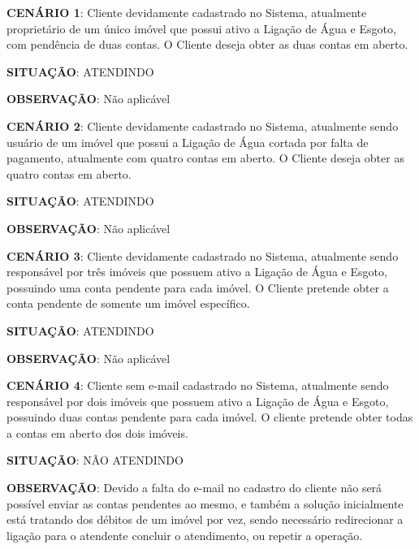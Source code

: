\begin{flushleft}
	\begin{description}
		\item \textbf{CENÁRIO 1}: Cliente devidamente cadastrado no Sistema, atualmente proprietário de um único imóvel que possui ativo a Ligação de Água e Esgoto, com pendência de duas contas. O Cliente deseja obter as duas contas em aberto.
		\item \textbf{SITUAÇÃO}: ATENDINDO
		\item \textbf{OBSERVAÇÃO}: Não aplicável
	\end{description}
	
	\begin{description}
		\item \textbf{CENÁRIO 2}: Cliente devidamente cadastrado no Sistema, atualmente sendo usuário de um imóvel que possui a Ligação de Água cortada por falta de pagamento, atualmente com quatro contas em aberto. O Cliente deseja obter as quatro contas em aberto.
		\item \textbf{SITUAÇÃO}: ATENDINDO
		\item \textbf{OBSERVAÇÃO}: Não aplicável
	\end{description}
	
	\begin{description}
		\item \textbf{CENÁRIO 3}: Cliente devidamente cadastrado no Sistema, atualmente sendo responsável por três imóveis que possuem ativo a Ligação de Água e Esgoto, possuindo uma conta pendente para cada imóvel. O Cliente pretende obter a conta pendente de somente um imóvel específico. 
		\item \textbf{SITUAÇÃO}: ATENDINDO
		\item \textbf{OBSERVAÇÃO}: Não aplicável
	\end{description}
	
	\begin{description}
		\item \textbf{CENÁRIO 4}: Cliente sem e-mail cadastrado no Sistema, atualmente sendo responsável por dois imóveis que possuem ativo a Ligação de Água e Esgoto, possuindo duas contas pendente para cada imóvel.  O cliente pretende obter todas a contas em aberto dos dois imóveis. 
		\item \textbf{SITUAÇÃO}: NÃO ATENDINDO
		\item \textbf{OBSERVAÇÃO}: Devido a falta do e-mail no cadastro do cliente não será possível enviar as contas pendentes ao mesmo, e também a solução inicialmente está tratando dos débitos de um imóvel por vez, sendo necessário redirecionar a ligação para o atendente concluir o atendimento, ou repetir a operação.
	\end{description}
\end{flushleft}


